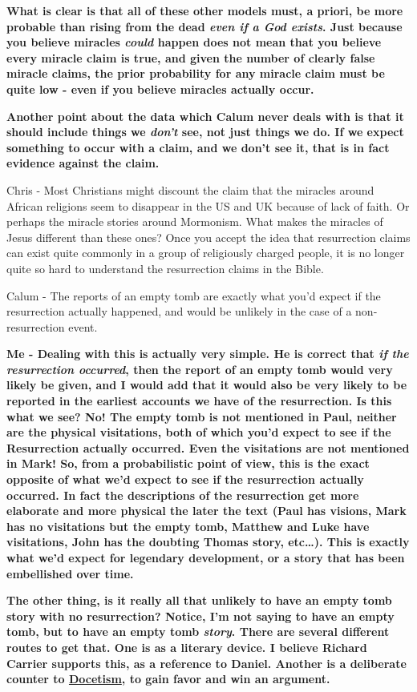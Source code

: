 \textbf{What is clear is that all of these other models must, a priori,
be more probable than rising from the dead \emph{even if a God exists}.
Just because you believe miracles \emph{could} happen does not mean that
you believe every miracle claim is true, and given the number of clearly
false miracle claims, the prior probability for any miracle claim must
be quite low - even if you believe miracles actually occur.}

\textbf{Another point about the data which Calum never deals with is
that it should include things we \emph{don't} see, not just things we
do. If we expect something to occur with a claim, and we don't see it,
that is in fact evidence against the claim.}

Chris - Most Christians might discount the claim that the miracles
around African religions seem to disappear in the US and UK because of
lack of faith. Or perhaps the miracle stories around Mormonism. What
makes the miracles of Jesus different than these ones? Once you accept
the idea that resurrection claims can exist quite commonly in a group of
religiously charged people, it is no longer quite so hard to understand
the resurrection claims in the Bible.

Calum - The reports of an empty tomb are exactly what you'd expect if
the resurrection actually happened, and would be unlikely in the case of
a non-resurrection event.

\textbf{Me - Dealing with this is actually very simple. He is correct
that \emph{if the resurrection occurred}, then the report of an empty
tomb would very likely be given, and I would add that it would also be
very likely to be reported in the earliest accounts we have of the
resurrection. Is this what we see? No! The empty tomb is not mentioned
in Paul, neither are the physical visitations, both of which you'd
expect to see if the Resurrection actually occurred. Even the
visitations are not mentioned in Mark! So, from a probabilistic point of
view, this is the exact opposite of what we'd expect to see if the
resurrection actually occurred. In fact the descriptions of the
resurrection get more elaborate and more physical the later the text
(Paul has visions, Mark has no visitations but the empty tomb, Matthew
and Luke have visitations, John has the doubting Thomas story,
etc\ldots{}). This is exactly what we'd expect for legendary
development, or a story that has been embellished over time.}

\textbf{The other thing, is it really all that unlikely to have an empty
tomb story with no resurrection? Notice, I'm not saying to have an empty
tomb, but to have an empty tomb \emph{story}. There are several
different routes to get that. One is as a literary device. I believe
Richard Carrier supports this, as a reference to Daniel. Another is a
deliberate counter to
\href{http://en.wikipedia.org/wiki/Docetism}{Docetism}, to gain favor
and win an argument.}


